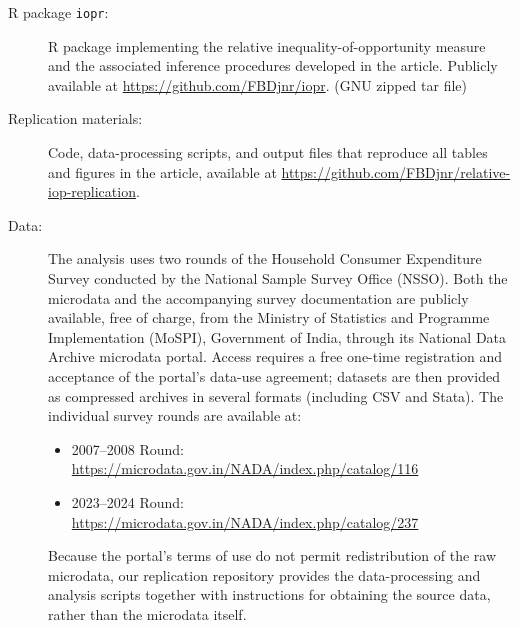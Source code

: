 \documentclass[12pt]{article}
\theoremstyle{plain}
\theoremstyle{definition}
\begin{document}
\begin{description}
\item[\textsf{R} package \texttt{iopr}:] \textsf{R} package implementing the
relative inequality-of-opportunity measure and the associated inference
procedures developed in the article. Publicly available at
\url{https://github.com/FBDjnr/iopr}. (GNU zipped tar file)

\item[Replication materials:] Code, data-processing scripts, and output
files that reproduce all tables and figures in the article, available at
\url{https://github.com/FBDjnr/relative-iop-replication}.

\item[Data:] The analysis uses two rounds of the Household Consumer
Expenditure Survey conducted by the National Sample Survey Office (NSSO).
Both the microdata and the accompanying survey documentation are publicly
available, free of charge, from the Ministry of Statistics and Programme
Implementation (MoSPI), Government of India, through its National Data
Archive microdata portal. Access requires a free one-time registration and
acceptance of the portal's data-use agreement; datasets are then provided
as compressed archives in several formats (including CSV and Stata). The
individual survey rounds are available at:
\begin{itemize}
    \item 2007--2008 Round: \url{https://microdata.gov.in/NADA/index.php/catalog/116}
    \item 2023--2024 Round: \url{https://microdata.gov.in/NADA/index.php/catalog/237}
\end{itemize}
Because the portal's terms of use do not permit redistribution of the raw
microdata, our replication repository provides the data-processing and
analysis scripts together with instructions for obtaining the source data,
rather than the microdata itself.
\end{description}


\end{document}
